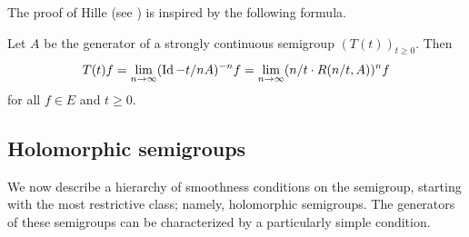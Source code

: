 The proof of Hille (see \textcite{kato:1976}) is inspired by the following formula.
\begin{proposition}\label{prop:a2-1.10}
Let $A$ be the generator of a strongly continuous semigroup $(T(t))_{t \geq 0}$.
Then
\begin{equation}\label{eq:a2-1.3}
    T(t)f = \lim_{n \to \infty} (\operatorname{Id} - t/nA)^{-n} f = \lim_{n \to \infty} (n/t \cdot R(n/t,A))^{n} f
\end{equation}
for all $f \in E$ and $t \geq 0$.
\end{proposition}
\subsection{Holomorphic semigroups} \label{subsec:a2-1.se4}%
We now describe a hierarchy of smoothness conditions on the semigroup, starting with the most restrictive class; namely, holomorphic semigroups.
The generators of these semigroups can be characterized by a particularly simple condition.


